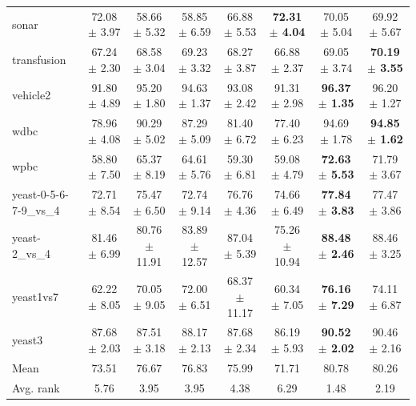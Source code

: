 \begin{table}[t]
\begin{tabular}{lccccccc}
sonar & 72.08 $\pm$ 3.97 & 58.66 $\pm$ 5.32 & 58.85 $\pm$ 6.59 & 66.88 $\pm$ 5.53 & \textbf{72.31 $\pm$ 4.04} & 70.05 $\pm$ 5.04 & 69.92 $\pm$ 5.67 \\
transfusion & 67.24 $\pm$ 2.30 & 68.58 $\pm$ 3.04 & 69.23 $\pm$ 3.32 & 68.27 $\pm$ 3.87 & 66.88 $\pm$ 2.37 & 69.05 $\pm$ 3.74 & \textbf{70.19 $\pm$ 3.55} \\
vehicle2 & 91.80 $\pm$ 4.89 & 95.20 $\pm$ 1.80 & 94.63 $\pm$ 1.37 & 93.08 $\pm$ 2.42 & 91.31 $\pm$ 2.98 & \textbf{96.37 $\pm$ 1.35} & 96.20 $\pm$ 1.27 \\
wdbc & 78.96 $\pm$ 4.08 & 90.29 $\pm$ 5.02 & 87.29 $\pm$ 5.09 & 81.40 $\pm$ 6.72 & 77.40 $\pm$ 6.23 & 94.69 $\pm$ 1.78 & \textbf{94.85 $\pm$ 1.62} \\
wpbc & 58.80 $\pm$ 7.50 & 65.37 $\pm$ 8.19 & 64.61 $\pm$ 5.76 & 59.30 $\pm$ 6.81 & 59.08 $\pm$ 4.79 & \textbf{72.63 $\pm$ 5.53} & 71.79 $\pm$ 3.67 \\
yeast-0-5-6-7-9\_vs\_4 & 72.71 $\pm$ 8.54 & 75.47 $\pm$ 6.50 & 72.74 $\pm$ 9.14 & 76.76 $\pm$ 4.36 & 74.66 $\pm$ 6.49 & \textbf{77.84 $\pm$ 3.83} & 77.47 $\pm$ 3.86 \\
yeast-2\_vs\_4 & 81.46 $\pm$ 6.99 & 80.76 $\pm$ 11.91 & 83.89 $\pm$ 12.57 & 87.04 $\pm$ 5.39 & 75.26 $\pm$ 10.94 & \textbf{88.48 $\pm$ 2.46} & 88.46 $\pm$ 3.25 \\
yeast1vs7 & 62.22 $\pm$ 8.05 & 70.05 $\pm$ 9.05 & 72.00 $\pm$ 6.51 & 68.37 $\pm$ 11.17 & 60.34 $\pm$ 7.05 & \textbf{76.16 $\pm$ 7.29} & 74.11 $\pm$ 6.87 \\
yeast3 & 87.68 $\pm$ 2.03 & 87.51 $\pm$ 3.18 & 88.17 $\pm$ 2.13 & 87.68 $\pm$ 2.34 & 86.19 $\pm$ 5.93 & \textbf{90.52 $\pm$ 2.02} & 90.46 $\pm$ 2.16 \\
\midrule
Mean & 73.51 & 76.67 & 76.83 & 75.99 & 71.71 & 80.78 & 80.26 \\
Avg. rank & 5.76 & 3.95 & 3.95 & 4.38 & 6.29 & 1.48 & 2.19 \\
\bottomrule
\end{tabular}
\end{table}